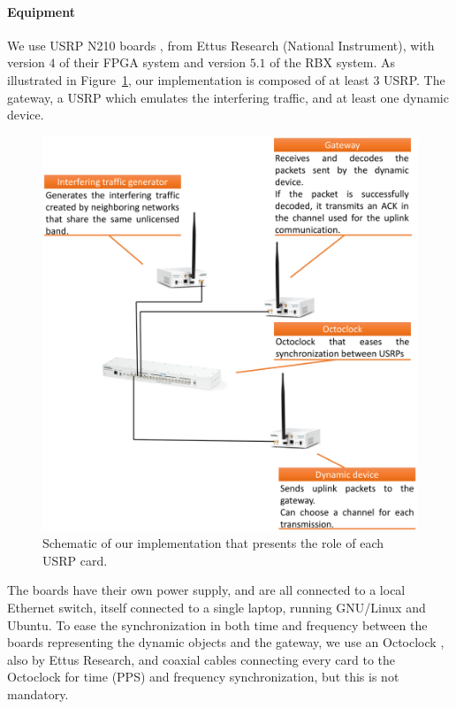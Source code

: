 \paragraph{Equipment}
We use USRP N210 boards \cite{USRPDocumentation}, from Ettus Research (National Instrument),
with version $4$ of their FPGA system and version $5.1$ of the RBX system.
As illustrated in Figure~\ref{fig:42:our_demo}, our implementation is composed of at least $3$ USRP.
The gateway, a USRP which emulates the interfering traffic, and at least one dynamic device.

\begin{figure}[!t]
    \centering
    \includegraphics[width=0.70\linewidth]{our-demo.eps}
    \caption{Schematic of our implementation that presents the role of each USRP card.}
    \label{fig:42:our_demo}
\end{figure}

The boards have their own power supply, and are all connected to a local Ethernet switch, itself connected to a single laptop, running GNU/Linux and Ubuntu.
To ease the synchronization in both time and frequency between the boards representing the dynamic objects and the gateway, we use an Octoclock \cite{OctoclockProduct}, also by Ettus Research,
and coaxial cables connecting every card to the Octoclock for time (PPS) and frequency synchronization, but this is not mandatory.

